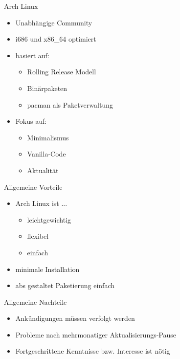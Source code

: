
\begin{slide}{Arch Linux}
	\begin{itemize}
		\item{Unabh\"{a}ngige Community}
		\item{i686 und x86\_64 optimiert}
		\item{basiert auf:
			\begin{itemize}
				\item{Rolling Release Modell}
				\item{Bin\"{a}rpaketen}
				\item{pacman als Paketverwaltung}
			\end{itemize}
		}
		\item{Fokus auf:
			\begin{itemize}
				\item{Minimalismus}
				\item{Vanilla-Code}
				\item{Aktualit\"{a}t}
			\end{itemize}
		}
	\end{itemize}
\end{slide}

\begin{slide}{Allgemeine Vorteile}
	\begin{itemize}
		\item{Arch Linux ist ...
			\begin{itemize}
				\item{leichtgewichtig}
				\item{flexibel}
				\item{einfach}
			\end{itemize}
		}
		\item{minimale Installation}
		\item{abs gestaltet Paketierung einfach}
	\end{itemize}
\end{slide}

\begin{slide}{Allgemeine Nachteile}
	\begin{itemize}
		\item{Ank\"{u}ndigungen m\"{u}ssen verfolgt werden}
		\item{Probleme nach mehrmonatiger Aktualisierungs-Pause}
		\item{Fortgeschrittene Kenntnisse bzw. Interesse ist n\"{o}tig}
	\end{itemize}
\end{slide}


